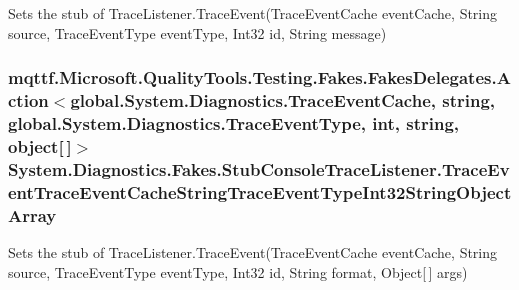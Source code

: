 Sets the stub of Trace\-Listener.\-Trace\-Event(\-Trace\-Event\-Cache event\-Cache, String source, Trace\-Event\-Type event\-Type, Int32 id, String message)

\hypertarget{class_system_1_1_diagnostics_1_1_fakes_1_1_stub_console_trace_listener_a7e30beb588a049bc13dfaba64b01693e}{
\subsubsection[{Trace\-Event\-Trace\-Event\-Cache\-String\-Trace\-Event\-Type\-Int32\-String\-Object\-Array}]{\setlength{\rightskip}{0pt plus 5cm}mqttf.\-Microsoft.\-Quality\-Tools.\-Testing.\-Fakes.\-Fakes\-Delegates.\-Action$<$global.\-System.\-Diagnostics.\-Trace\-Event\-Cache, string, global.\-System.\-Diagnostics.\-Trace\-Event\-Type, int, string, object\mbox{[}$\,$\mbox{]}$>$ System.\-Diagnostics.\-Fakes.\-Stub\-Console\-Trace\-Listener.\-Trace\-Event\-Trace\-Event\-Cache\-String\-Trace\-Event\-Type\-Int32\-String\-Object\-Array}}\label{class_system_1_1_diagnostics_1_1_fakes_1_1_stub_console_trace_listener_a7e30beb588a049bc13dfaba64b01693e}


Sets the stub of Trace\-Listener.\-Trace\-Event(\-Trace\-Event\-Cache event\-Cache, String source, Trace\-Event\-Type event\-Type, Int32 id, String format, Object\mbox{[}$\,$\mbox{]} args)

